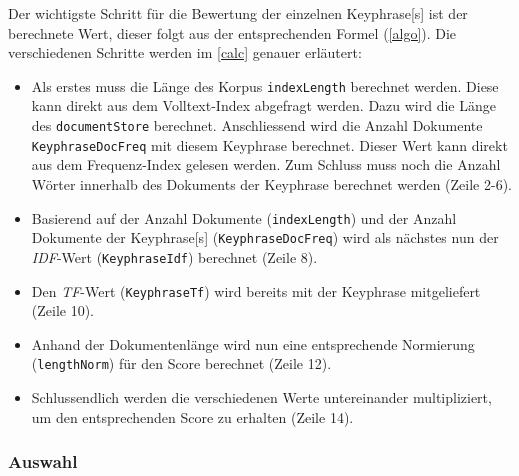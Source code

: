 
Der wichtigste Schritt für die Bewertung der einzelnen \gls{Keyphrase}[s] ist der berechnete Wert, dieser folgt aus der entsprechenden Formel (\autoref{algo}). Die verschiedenen Schritte werden im \autoref{calc} genauer erläutert:
\begin{itemize}
    \item Als erstes muss die Länge des Korpus \texttt{indexLength} berechnet werden. Diese kann direkt aus dem Volltext-Index abgefragt werden. Dazu wird die Länge des \texttt{documentStore} berechnet. Anschliessend wird die Anzahl Dokumente \texttt{KeyphraseDocFreq} mit diesem \gls{Keyphrase} berechnet. Dieser Wert kann direkt aus dem Frequenz-Index gelesen werden. Zum Schluss muss noch die Anzahl Wörter innerhalb des Dokuments der \gls{Keyphrase} berechnet werden (Zeile 2-6). 
    \item Basierend auf der Anzahl Dokumente (\texttt{indexLength}) und der Anzahl Dokumente der \gls{Keyphrase}[s] (\texttt{KeyphraseDocFreq}) wird als nächstes nun der \textit{IDF}-Wert (\texttt{KeyphraseIdf}) berechnet (Zeile 8). \item Den \textit{TF}-Wert (\texttt{KeyphraseTf}) wird bereits mit der \gls{Keyphrase} mitgeliefert (Zeile 10).
    \item Anhand der Dokumentenlänge wird nun eine entsprechende Normierung (\texttt{lengthNorm}) für den \gls{Score} berechnet (Zeile 12).
    \item Schlussendlich werden die verschiedenen Werte untereinander multipliziert, um den entsprechenden \gls{Score} zu erhalten (Zeile 14).
\end{itemize}



\subsubsection{Auswahl}


